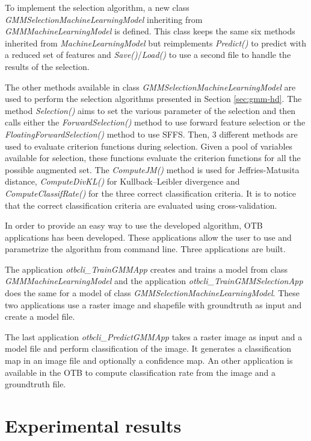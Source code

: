 \documentclass[journal,peerreview,onecolumn]{IEEEtran}
\begin{document}
    To implement the selection algorithm, a new class \emph{GMMSelectionMachineLearningModel} inheriting from \emph{GMMMachineLearningModel} is defined. This class keeps the same six methods inherited from \emph{MachineLearningModel} but reimplements \emph{Predict()} to predict with a reduced set of features and  \emph{Save()}/\emph{Load()} to use a second file to handle the results of the selection.

    The other methods available in class \emph{GMMSelectionMachineLearningModel} are used to perform the selection algorithms presented in Section \ref{sec:gmm-hd}. The method \emph{Selection()} aims to set the various parameter of the selection and then calls either the \emph{ForwardSelection()} method to use forward feature selection or the \emph{FloatingForwardSelection()} method to use SFFS. Then, 3 different methods are used to evaluate criterion functions during selection. Given a pool of variables available for selection, these functions evaluate the criterion functions for all the possible augmented set. The \emph{ComputeJM()} method is used for Jeffries-Matusita distance, \emph{ComputeDivKL()} for Kullback–Leibler divergence and \emph{ComputeClassifRate()} for the three correct classification criteria. It is to notice that the correct classification criteria are evaluated using cross-validation.

    In order to provide an easy way to use the developed algorithm, OTB applications has been developed. These applications allow the user to use and parametrize the algorithm from command line. Three applications are built.

    The application \emph{otbcli\_TrainGMMApp} creates and trains a model from class \emph{GMMMachineLearningModel} and the application \emph{otbcli\_TrainGMMSelectionApp} does the same for a model of class \emph{GMMSelectionMachineLearningModel}. These two applications use a raster image and shapefile with groundtruth as input and create a model file.

    The last application \emph{otbcli\_PredictGMMApp} takes a raster image as input and a model file and perform classification of the image. It generates a classification map in an image file and optionally a confidence map. An other application is available in the OTB to compute classification rate from the image and a groundtruth file.

\section{Experimental results}
\label{sec:test}
\end{document}
